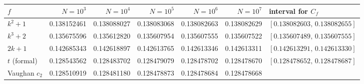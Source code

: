 \begin{tabular}{lrrrrrl}
\toprule
$f$ & $N=10^{3}$ & $N=10^{4}$ & $N=10^{5}$ & $N=10^{6}$ & $N=10^{7}$ & interval for $C_f$ \\
\midrule
$k^2+1$ & 0.138152461 & 0.138088027 & 0.138083068 & 0.138082663 & 0.138082629 & $[0.138082603,\,0.138082655]$ \\
$k^3+2$ & 0.135675596 & 0.135612820 & 0.135607954 & 0.135607555 & 0.135607522 & $[0.135607489,\,0.135607555]$ \\
$2k+1$ & 0.142685343 & 0.142618897 & 0.142613765 & 0.142613346 & 0.142613311 & $[0.142613291,\,0.142613330]$ \\
$t$ (formal) & 0.128543562 & 0.128483702 & 0.128479079 & 0.128478702 & 0.128478670 & $[0.128478652,\,0.128478687]$ \\
Vaughan $c_2$ & 0.128510919 & 0.128481180 & 0.128478873 & 0.128478684 & 0.128478668 & \\
\bottomrule
\end{tabular}
